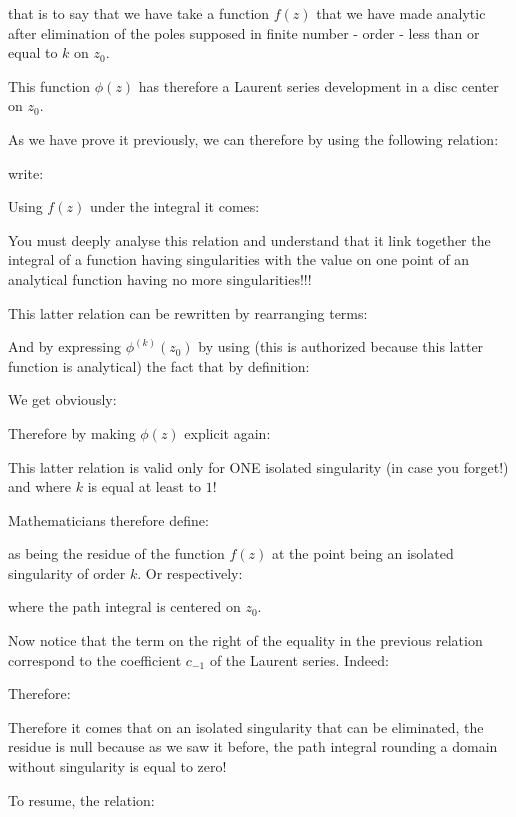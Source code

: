 	that is to say that we have take a function $f(z)$ that we have made analytic after elimination of the poles supposed in finite number - order - less than or equal to $k$ on $z_0$. 
	
	This function $\phi(z)$ has therefore a Laurent series development in a disc center on $z_0$.
	
	As we have prove it previously, we can therefore by using the following relation:
	
	write:
	
	Using $f(z)$ under the integral it comes:
	
	You must deeply analyse this relation and understand that it link together the integral of a function having singularities with the value on one point of an analytical function having no more singularities!!!
	
	This latter relation can be rewritten by rearranging terms:
	
	And by expressing $\phi^{(k)}(z_0)$ by using (this is authorized because this latter function is analytical) the fact that by definition:
	
	We get obviously:
	
	Therefore by making $\phi(z)$ explicit again:
	
	This latter relation is valid only for ONE isolated singularity (in case you forget!) and where $k$ is equal at least to $1$!

	Mathematicians therefore define:
	
	as being the residue of the function $f(z)$ at the point being an isolated singularity of order $k$. Or respectively:
	
	where the path integral is centered on $z_0$.
	
	Now notice that the term on the right of the equality in the previous relation correspond to the coefficient $c_{-1}$ of the Laurent series. Indeed:
	
	Therefore:
	
	\begin{tcolorbox}[title=Remark,arc=10pt,breakable,drop lifted shadow,
  skin=enhanced,
  skin first is subskin of={enhancedfirst}{arc=10pt,no shadow},
  skin middle is subskin of={enhancedmiddle}{arc=10pt,no shadow},
  skin last is subskin of={enhancedlast}{drop lifted shadow}]
	Therefore it comes that on an isolated singularity that can be eliminated, the residue is null because as we saw it before, the path integral rounding a domain without singularity is equal to zero!
	\end{tcolorbox}
	To resume, the relation:
	
